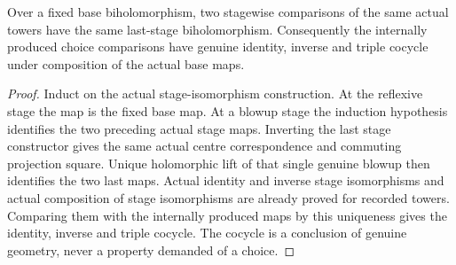 \begin{lemma}
\label{hir:general-nc-actual-choice-comparison-cocycle}
\leanok
Over a fixed base biholomorphism, two stagewise comparisons of the same
actual towers have the same last-stage biholomorphism. Consequently
the internally produced choice comparisons have genuine identity,
inverse and triple cocycle under composition of the actual base maps.
\end{lemma}
\begin{proof}
Induct on the actual stage-isomorphism construction. At the reflexive
stage the map is the fixed base map. At a blowup stage the induction
hypothesis identifies the two preceding actual stage maps. Inverting
the last stage constructor gives the same actual centre correspondence
and commuting projection square. Unique holomorphic lift of that
single genuine blowup then identifies the two last maps. Actual
identity and inverse stage isomorphisms and actual composition of
stage isomorphisms are already proved for recorded towers. Comparing
them with the internally produced maps by this uniqueness gives the
identity, inverse and triple cocycle. The cocycle is a conclusion
of genuine geometry, never a property demanded of a choice.
\end{proof}

